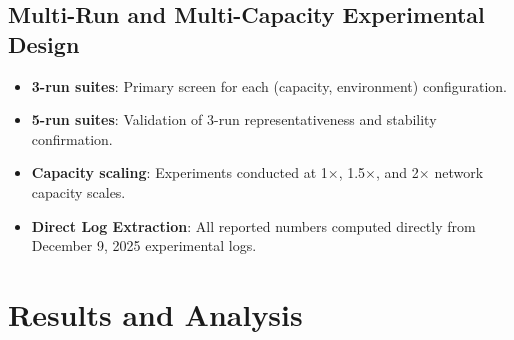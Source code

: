 \documentclass[12pt,a4paper]{article}
\begin{document}
\subsection{Multi-Run and Multi-Capacity Experimental Design}
\begin{itemize}
\item \textbf{3-run suites}: Primary screen for each (capacity, environment) configuration.
\item \textbf{5-run suites}: Validation of 3-run representativeness and stability confirmation.
\item \textbf{Capacity scaling}: Experiments conducted at 1$\times$, 1.5$\times$, and 2$\times$ network capacity scales.
\item \textbf{Direct Log Extraction}: All reported numbers computed directly from December 9, 2025 experimental logs.
\end{itemize}

\newpage
\section{Results and Analysis}
\end{document}
